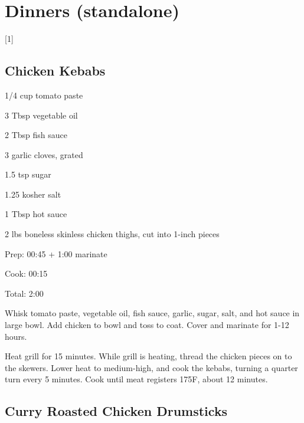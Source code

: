 \documentclass[oneside]{book}  %
\def\thisrecipe{}  %
\newcommand{\chapterrec}[1]{  %
  \newpage \def\thisrecipe{} \chapter{#1} \vspace{1.1em}
}
\newcommand{\chaptertoc}[1]{  %
  \chapterrec{#1} \vspace{-1.1em}  %
  \startcontents[chapters] \printcontents[chapters]{chapter_toc_}{1}[1]{}
}
\newcommand{\recipe}[1]{\section{#1}\def\thisrecipe{: #1}} %
\newcommand{\degF}{\textdegree F\xspace}
\begin{document}
\chaptertoc{Dinners (standalone)} \label{chap:dinners_standalone}
\recipe{Chicken Kebabs} \label{recipe:chicken_kebabs} %

\begin{IT}[0.69]
  \begin{ingredients}
    \item[1/4 cup] tomato paste
    \item[3 Tbsp] vegetable oil
    \item[2 Tbsp] fish sauce
    \item[3] garlic cloves, grated
    \item[1.5 tsp] sugar
    \item[1.25] kosher salt
    \item[1 Tbsp] hot sauce
    \item[2 lbs] boneless skinless chicken thighs, cut into 1-inch pieces
  \end{ingredients}

  \switchcolumn

  \begin{timeline}
    \item[Prep:]  00:45 + 1:00 marinate
    \item[Cook:]  00:15
    \item[Total:] 2:00
  \end{timeline}
\end{IT}

\begin{directions}
  \item Whisk tomato paste, vegetable oil, fish sauce, garlic, sugar, salt, and
  hot sauce in large bowl. Add chicken to bowl and toss to coat. Cover and
  marinate for 1-12 hours.

  \item Heat grill for 15 minutes. While grill is heating, thread the chicken
  pieces on to the skewers. Lower heat to medium-high, and cook the kebabs,
  turning a quarter turn every 5 minutes. Cook until meat registers 175\degF,
  about 12 minutes.
\end{directions}
\recipe{Curry Roasted Chicken Drumsticks} \label{recipe:curry_roasted_chicken_drumsticks} %
\end{document}
